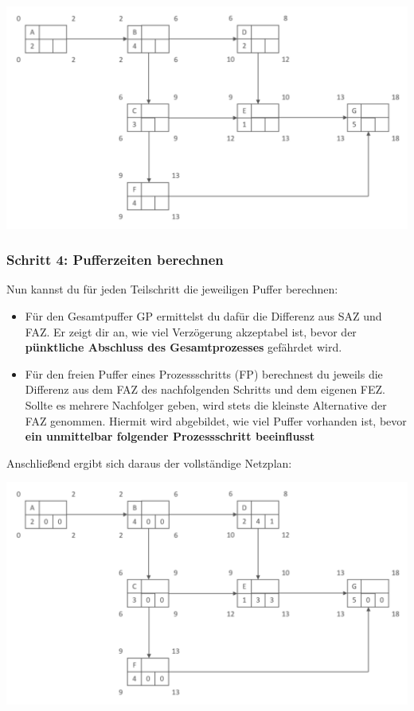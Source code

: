 \begin{center}
	\includegraphics[width=\textwidth]{Bilder/Netzplan/Netzplan3.png}
\end{center}

\subsubsection{Schritt 4: Pufferzeiten berechnen}

Nun kannst du für jeden Teilschritt die jeweiligen Puffer berechnen:

\begin{itemize}
	\item Für den Gesamtpuffer GP ermittelst du dafür die Differenz aus SAZ und FAZ. Er zeigt dir an, wie viel Verzögerung akzeptabel ist, bevor der \textbf{pünktliche Abschluss des Gesamtprozesses} gefährdet wird.
	\item Für den freien Puffer eines Prozessschritts (FP) berechnest du jeweils die Differenz aus dem FAZ des nachfolgenden Schritts und dem eigenen FEZ. Sollte es mehrere Nachfolger geben, wird stets die kleinste Alternative der FAZ genommen. Hiermit wird abgebildet, wie viel Puffer vorhanden ist, bevor \textbf{ein unmittelbar folgender Prozessschritt beeinflusst}
\end{itemize}

Anschließend ergibt sich daraus der vollständige Netzplan:

\begin{center}
	\includegraphics[width=\textwidth]{Bilder/Netzplan/Netzplan4.png}
\end{center}

